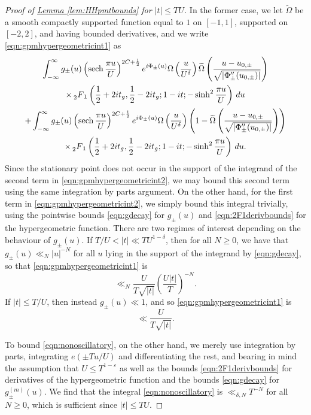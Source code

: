 \documentclass[11pt,a4paper]{amsart}
\newcommand{\e}{\varepsilon}
\DeclareMathOperator{\sech}{sech}
\numberwithin{equation}{section}
\theoremstyle{remark}
\theoremstyle{definition}
\begin{document}
\begin{proof}[Proof of {\hyperref[lem:HHpmtbounds]{Lemma \ref*{lem:HHpmtbounds}}} for $|t| \leq TU$]
In the former case, we let $\widetilde{\Omega}$ be a smooth compactly supported function equal to $1$ on $[-1,1]$, supported on $[-2,2]$, and having bounded derivatives, and we write \eqref{eqn:gpmhypergeometricint1} as
\begin{multline}
\label{eqn:gpmhypergeometricint2}
\int_{-\infty}^{\infty} g_{\pm}(u) \left(\sech \frac{\pi u}{U}\right)^{2C + \frac{1}{2}} e^{i\Phi_{\pm}(u)} \Omega\left(\frac{u}{U^{\delta}}\right) \widetilde{\Omega}\left(\frac{u - u_{0,\pm}}{\sqrt{|\Phi_{\pm}''(u_{0,\pm})|}}\right)	\\
\times \prescript{}{2}{F}_1\left(\frac{1}{2} + 2it_g,\frac{1}{2} - 2it_g;1 - it; -\sinh^2 \frac{\pi u}{U}\right) \, du	\\
+ \int_{-\infty}^{\infty} g_{\pm}(u) \left(\sech \frac{\pi u}{U}\right)^{2C + \frac{1}{2}} e^{i\Phi_{\pm}(u)} \Omega\left(\frac{u}{U^{\delta}}\right) \left(1 - \widetilde{\Omega}\left(\frac{u - u_{0,\pm}}{\sqrt{|\Phi_{\pm}''(u_{0,\pm})|}}\right)\right)	\\
\times \prescript{}{2}{F}_1\left(\frac{1}{2} + 2it_g,\frac{1}{2} - 2it_g;1 - it; -\sinh^2 \frac{\pi u}{U}\right) \, du.
\end{multline}
Since the stationary point does not occur in the support of the integrand of the second term in \eqref{eqn:gpmhypergeometricint2}, we may bound this second term using the same integration by parts argument. On the other hand, for the first term in \eqref{eqn:gpmhypergeometricint2}, we simply bound this integral trivially, using the pointwise bounds \eqref{eqn:gdecay} for $g_{\pm}(u)$ and \eqref{eqn:2F1derivbounds} for the hypergeometric function. There are two regimes of interest depending on the behaviour of $g_{\pm}(u)$. If $T/U < |t| \ll TU^{1 - \delta}$, then for all $N \geq 0$, we have that $g_{\pm}(u) \ll_{N} |u|^{-N}$ for all $u$ lying in the support of the integrand by \eqref{eqn:gdecay}, so that \eqref{eqn:gpmhypergeometricint1} is
\[\ll_N \frac{U}{T\sqrt{|t|}} \left(\frac{U|t|}{T}\right)^{-N}.\]
If $|t| \leq T/U$, then instead $g_{\pm}(u) \ll 1$, and so \eqref{eqn:gpmhypergeometricint1} is
\[\ll \frac{U}{T\sqrt{|t|}}.\]

To bound \eqref{eqn:nonoscillatory}, on the other hand, we merely use integration by parts, integrating $e(\pm Tu/U)$ and differentiating the rest, and bearing in mind the assumption that $U \leq T^{1 - \e}$ as well as the bounds \eqref{eqn:2F1derivbounds} for derivatives of the hypergeometric function and the bounds \eqref{eqn:gdecay} for $g_{\pm}^{(m)}(u)$. We find that the integral \eqref{eqn:nonoscillatory} is $\ll_{\delta,N} T^{-N}$ for all $N \geq 0$, which is sufficient since $|t| \leq TU$.
\end{proof}
\end{document}
